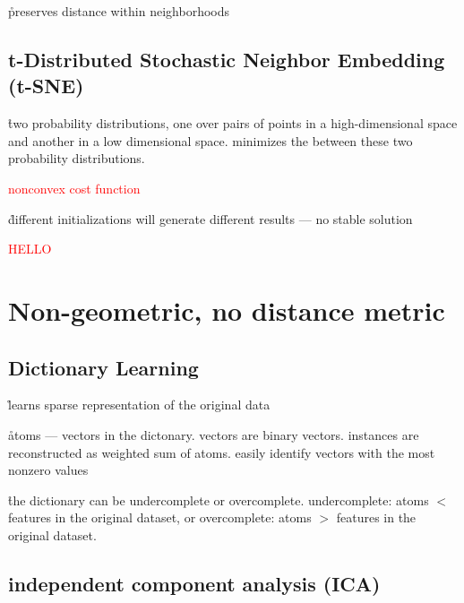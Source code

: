 \r{preserves distance within neighborhoods}


\subsection{t-Distributed Stochastic Neighbor Embedding (t-SNE)}




\r{two probability distributions, one over pairs of points in a high-dimensional space and another in a low dimensional space. minimizes the  between these two probability distributions.}


\textcolor{red}{nonconvex cost function}

\r{different initializations will generate different results --- no stable solution}

\textcolor{red}{HELLO}

\section{Non-geometric, no distance metric}

\subsection{Dictionary Learning}


\r{learns sparse representation of the original data}

\r{atoms --- vectors in the dictonary. vectors are binary vectors. instances are reconstructed as weighted sum of atoms. easily identify vectors with the most nonzero values}

\r{the dictionary can be undercomplete or overcomplete. undercomplete: atoms $<$ features in the original dataset, or overcomplete: atoms $>$ features in the original dataset.}



\subsection{independent component analysis (ICA)}


